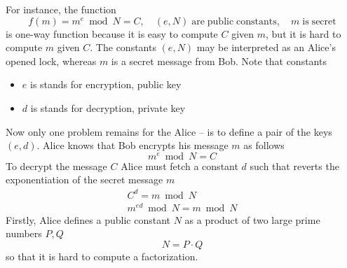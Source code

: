 ﻿For instance, the function
\begin{equation*}
    f(m) = m^e \bmod N = C, \quad (e, N) \mathrm{\; are \; public \; constants}, \quad m \; \mathrm{is \; secret}
\end{equation*}
is one-way function because it is easy to compute $C$ given $m$, but it is hard to compute $m$ given $C$.
The constants $(e, N)$ may be interpreted as an Alice's opened lock, whereas $m$ is a secret message from Bob.
Note that constants
\begin{itemize}
    \item $e$ is stands for encryption, public key
    \item $d$ is stands for decryption, private key
\end{itemize}
Now only one problem remains for the Alice -- is to define a pair of the keys $(e, d)$.
Alice knows that Bob encrypts his message $m$ as follows
\[
    m^e \bmod N = C
\]
To decrypt the message $C$ Alice must fetch a constant $d$ such that reverts the exponentiation of the
secret message $m$
\begin{eqnarray*}
    C^d = m \bmod N \\
    m^{ed} \bmod N = m \bmod N
\end{eqnarray*}
Firstly, Alice defines a public constant $N$ as a product of two large prime numbers $P, Q$
\[
    N = P \cdot Q
\]
so that it is hard to compute a factorization.

